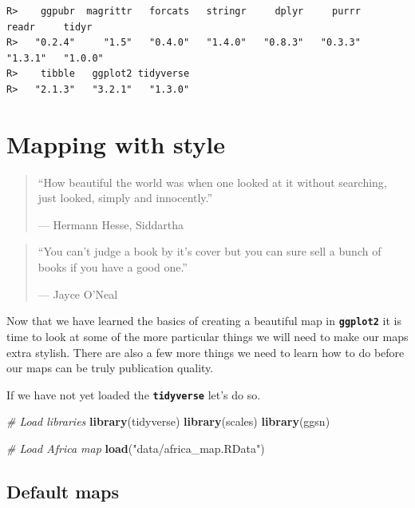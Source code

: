 \documentclass[
]{book}
\newenvironment{Shaded}{\begin{snugshade}}{\end{snugshade}}
\newcommand{\CommentTok}[1]{\textcolor[rgb]{0.56,0.35,0.01}{\textit{#1}}}
\newcommand{\KeywordTok}[1]{\textcolor[rgb]{0.13,0.29,0.53}{\textbf{#1}}}
\newcommand{\NormalTok}[1]{#1}
\newcommand{\StringTok}[1]{\textcolor[rgb]{0.31,0.60,0.02}{#1}}
\begin{document}
\begin{verbatim}
R>    ggpubr  magrittr   forcats   stringr     dplyr     purrr     readr     tidyr 
R>   "0.2.4"     "1.5"   "0.4.0"   "1.4.0"   "0.8.3"   "0.3.3"   "1.3.1"   "1.0.0" 
R>    tibble   ggplot2 tidyverse 
R>   "2.1.3"   "3.2.1"   "1.3.0"
\end{verbatim}

\hypertarget{mapping_style}{%
\chapter{Mapping with style}\label{mapping_style}}

\begin{quote}
``How beautiful the world was when one looked at it without searching, just looked, simply and innocently.''

--- Hermann Hesse, Siddartha
\end{quote}

\begin{quote}
``You can't judge a book by it's cover but you can sure sell a bunch of books if you have a good one.''

--- Jayce O'Neal
\end{quote}

Now that we have learned the basics of creating a beautiful map in \textbf{\texttt{ggplot2}} it is time to look at some of the more particular things we will need to make our maps extra stylish. There are also a few more things we need to learn how to do before our maps can be truly publication quality.

If we have not yet loaded the \textbf{\texttt{tidyverse}} let's do so.

\begin{Shaded}
\begin{Highlighting}[]
\CommentTok{\# Load libraries}
\KeywordTok{library}\NormalTok{(tidyverse)}
\KeywordTok{library}\NormalTok{(scales)}
\KeywordTok{library}\NormalTok{(ggsn)}

\CommentTok{\# Load Africa map}
\KeywordTok{load}\NormalTok{(}\StringTok{"data/africa\_map.RData"}\NormalTok{)}
\end{Highlighting}
\end{Shaded}

\hypertarget{default-maps}{%
\section{Default maps}\label{default-maps}}
\end{document}
